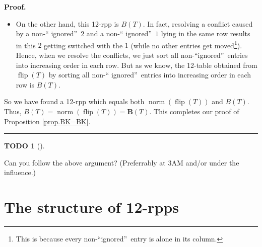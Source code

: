 \documentclass[numbers=enddot,12pt,final,onecolumn,notitlepage]{scrartcl}%
\theoremstyle{definition}
\newtheorem{quest}[theo]{TODO}
\newenvironment{todo}[1][]
{\begin{quest}[#1]\begin{leftbar}}
{\end{leftbar}\end{quest}}
\newenvironment{proof}[1][Proof]{\noindent\textbf{#1.} }{\ \rule{0.5em}{0.5em}}
\begin{document}
\begin{proof}
\begin{itemize}
\item On the other hand, this 12-rpp is $B\left(  T\right)  $. In fact,
resolving a conflict caused by a non-\textquotedblleft
ignored\textquotedblright\ $2$ and a non-\textquotedblleft
ignored\textquotedblright\ $1$ lying in the same row results in this $2$
getting switched with the $1$ (while no other entries get moved\footnote{This
is because every non-\textquotedblleft ignored\textquotedblright\ entry is
alone in its column.}). Hence, when we resolve the conflicts, we just sort all
non-\textquotedblleft ignored\textquotedblright\ entries into increasing order
in each row. But as we know, the 12-table obtained from $\operatorname*{flip}%
\left(  T\right)  $ by sorting all non-\textquotedblleft
ignored\textquotedblright\ entries into increasing order in each row is
$B\left(  T\right)  $.
\end{itemize}

So we have found a 12-rpp which equals both $\operatorname*{norm}\left(
\operatorname*{flip}\left(  T\right)  \right)  $ and $B\left(  T\right)  $.
Thus, $B\left(  T\right)  =\operatorname*{norm}\left(  \operatorname*{flip}%
\left(  T\right)  \right)  =\mathbf{B}\left(  T\right)  $. This completes our
proof of Proposition \ref{prop.BK=BK}.
\end{proof}

\begin{todo}
Can you follow the above argument? (Preferrably at 3AM and/or under the
influence.)
\end{todo}



\section{The structure of 12-rpps}
\def\cut{{\operatorname*{cut}}} %
\def\ceq{{\operatorname*{ceq}}}
\def\ircont{{\operatorname*{ircont}}}
\def\ceqvar{{{\alpha}}} %
\def\cutvar{{{\nu}}} %
\def\supp{{\operatorname*{supp}}}
\def\NS{{\operatorname*{NS}}}
\def\g{{\widetilde{g}}}
\def\t{{\mathbf{t}}}
\def\lm{{\lambda/\mu}}
\def\lmp{{(\lambda/\mu)}}
\def\N{{\mathbb{N}}}
\def\Z{\mathbb{Z}}

\def\OneTwoRPP{{\operatorname*{RPP}^{12}\left(  \lambda/\mu\right)}}
\def\OneTwoRPPCutvar{{\operatorname*{RPP}^{12}\left(  \lambda/\mu ;\cutvar \right)}}
\def\flip{{\operatorname*{flip}}}
\end{document}
